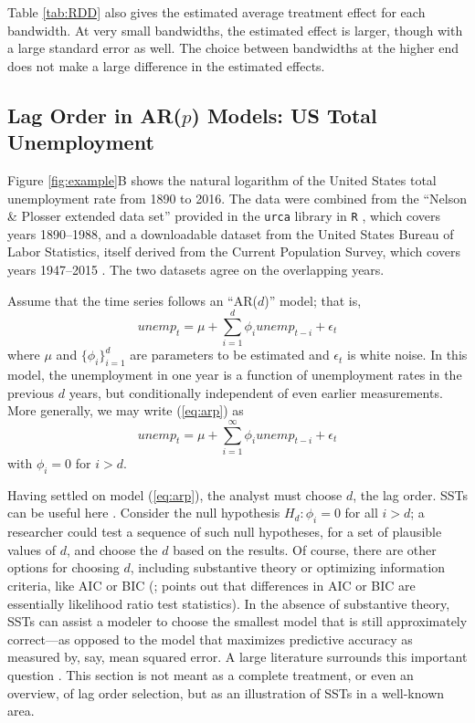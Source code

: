 \documentclass[sts]{imsart}\usepackage[]{graphicx}\usepackage[]{color}
\begin{document}
Table \ref{tab:RDD} also gives the estimated average treatment effect
for each bandwidth.
At very small bandwidths, the estimated effect is larger, though with a
large standard error as well.
The choice between bandwidths at the higher end does not make a large
difference in the estimated effects.

\subsection{Lag Order in AR($p$) Models: US Total Unemployment}


Figure \ref{fig:example}B shows the natural logarithm of the United States total
unemployment rate from 1890 to 2016.
The data were combined from the ``Nelson \& Plosser extended data
set'' provided in the \texttt{urca} library in \texttt{R}
\citep{urca,Rcite}, which covers years 1890--1988, and a downloadable
dataset from the United States Bureau of Labor Statistics, itself
derived from the Current Population Survey, which covers years
1947--2015 \citep{cps}.
The two datasets agree on the overlapping years.

Assume that the time series follows an ``AR($d$)'' model; that is,
\begin{equation}\label{eq:arp}
unemp_t=\mu + \displaystyle\sum_{i=1}^d \phi_i unemp_{t-i}+\epsilon_t
\end{equation}
where $\mu$ and $\{\phi_i\}_{i=1}^d$ are parameters to be estimated
and $\epsilon_t$ is white noise.
In this model, the unemployment in one year is a function of
unemployment rates in the previous $d$ years, but conditionally
independent of even earlier measurements.
More generally, we may write (\ref{eq:arp}) as
\begin{equation}\label{eq:arpinf}
unemp_t=\mu+\displaystyle\sum_{i=1}^\infty \phi_i
unemp_{t-i}+\epsilon_t
\end{equation}
with $\phi_i=0$ for $i>d$.

Having settled on model (\ref{eq:arp}), the analyst must choose $d$,
the lag order.
SSTs can be useful here \citep[e.g.][]{practitionersGuide}.
Consider the null hypothesis $H_d: \phi_i=0$ for all $i>d$;
a researcher could test a sequence of such null hypotheses, for a set
of plausible values of $d$, and choose the $d$ based on the results.
Of course, there are other options for choosing $d$, including
substantive theory or optimizing
information criteria, like AIC or BIC
(\citealt{akaike1969fitting,schwarz1978estimating};
\citealt{potscher1991effects} points out that differences in AIC or
BIC are essentially likelihood ratio test statistics).
In the absence of substantive theory, SSTs can assist a modeler to
choose the smallest model that is still approximately correct---as
opposed to the model that maximizes predictive accuracy as measured
by, say, mean squared error.
A large literature surrounds this important question \citep[See,
e.g.][and the citations
therein]{mcquarrie1998regression,liew2004lag}. This section is not
meant as a complete treatment, or even an overview, of lag order
selection, but as an illustration of SSTs in a well-known area.
\end{document}
